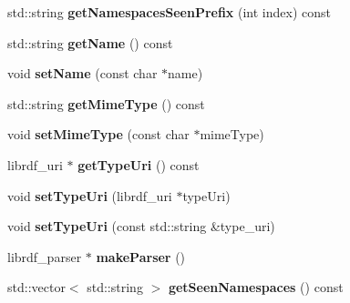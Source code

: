 \begin{DoxyCompactItemize}
\item 
\mbox{\label{classredland_1_1LibrdfParser_a89d1335343c9999db8207866de8202c1}} 
std\+::string {\bfseries get\+Namespaces\+Seen\+Prefix} (int index) const
\item 
\mbox{\label{classredland_1_1LibrdfParser_aaa813cd98f57703e2168e81cf1c8b356}} 
std\+::string {\bfseries get\+Name} () const
\item 
\mbox{\label{classredland_1_1LibrdfParser_a152feb7bf2aa291fc7ec48fe2769265a}} 
void {\bfseries set\+Name} (const char $\ast$name)
\item 
\mbox{\label{classredland_1_1LibrdfParser_aacf1514391f15d3687a35352f1c0da3d}} 
std\+::string {\bfseries get\+Mime\+Type} () const
\item 
\mbox{\label{classredland_1_1LibrdfParser_a8fe0e89950e9b71f86fa58e10eb475d8}} 
void {\bfseries set\+Mime\+Type} (const char $\ast$mime\+Type)
\item 
\mbox{\label{classredland_1_1LibrdfParser_ae6f233d632e3a515afe7afceabf4e5ef}} 
librdf\+\_\+uri $\ast$ {\bfseries get\+Type\+Uri} () const
\item 
\mbox{\label{classredland_1_1LibrdfParser_a81d772e0be266b00bf840fd9dbeab8d1}} 
void {\bfseries set\+Type\+Uri} (librdf\+\_\+uri $\ast$type\+Uri)
\item 
\mbox{\label{classredland_1_1LibrdfParser_a76ecf31cd9fb96ba4e10a35f383e47fc}} 
void {\bfseries set\+Type\+Uri} (const std\+::string \&type\+\_\+uri)
\item 
\mbox{\label{classredland_1_1LibrdfParser_a8055c22ada8b852112f4f011d9fa5abe}} 
librdf\+\_\+parser $\ast$ {\bfseries make\+Parser} ()
\item 
\mbox{\label{classredland_1_1LibrdfParser_a2c600b9ae3b59e4ae7e48b20e3513cb4}} 
std\+::vector$<$ std\+::string $>$ {\bfseries get\+Seen\+Namespaces} () const
\end{DoxyCompactItemize}
